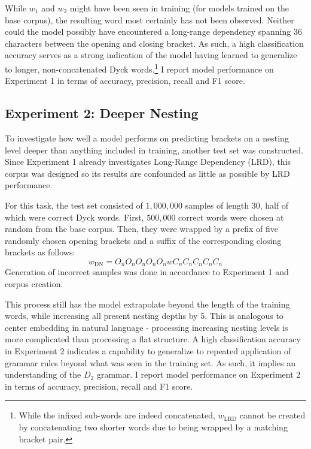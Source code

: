 While $w_{1}$ and $w_{2}$ might have been seen in training (for models trained on the base corpus), the resulting word most certainly has not been observed. Neither could the model possibly have encountered a long-range dependency spanning $36$ characters between the opening and closing bracket. As such, a high classification accuracy serves as a strong indication of the model having learned to generalize to longer, non-concatenated Dyck words.\footnote{While the infixed sub-words are indeed concatenated, $w_{\text{LRD}}$ cannot be created by concatenating two shorter words due to being wrapped by a matching bracket pair.} I report model performance on Experiment 1 in terms of accuracy, precision, recall and F1 score.

\subsection{Experiment 2: Deeper Nesting}\label{DN}
To investigate how well a model performs on predicting brackets on a nesting level deeper than anything included in training, another test set was constructed. Since Experiment 1 already investigates Long-Range Dependency (LRD), this corpus was designed so its results are confounded as little as possible by LRD performance.

For this task, the test set consisted of  $1{,}000{,}000$ samples of length $30$, half of which were correct Dyck words. First, $500,000$  correct words were chosen at random from the base corpus. Then, they were wrapped by a prefix of five randomly chosen opening brackets and a suffix of the corresponding closing brackets as follows:
\[
	w_{\text{DN}} = O_{n}O_{n}O_{n}O_{n}O_{n}wC_{n}C_{n}C_{n}C_{n}C_{n}
\]
Generation of incorrect samples was done in accordance to Experiment 1 and corpus creation.

This process still has the model extrapolate beyond the length of the training words, while increasing all present nesting depths by $5$. This is analogous to center embedding in natural language - processing increasing nesting levels is more complicated than processing a flat structure. A high classification accuracy in Experiment 2 indicates a capability to generalize to repeated application of grammar rules beyond what was seen in the training set. As such, it implies an understanding of the $D_{2}$ grammar. I report model performance on Experiment 2 in terms of accuracy, precision, recall and F1 score.